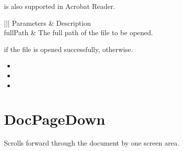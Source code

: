 \documentclass[letterpaper,12pt,english,openany,oneside]{sphinxmanual}
\begin{document}
 is also supported in Acrobat Reader.


\begin{sphinxVerbatim}[commandchars=\\\{\}]
\PYG{p}{[} \PYG{p}{]}
\end{sphinxVerbatim}
\label{\detokenize{IAC_API_DDE_Messages:parameters-6}}


\begin{savenotes}\sphinxattablestart
\centering
{}\label{\detokenize{IAC_API_DDE_Messages:section-6}}\nobreak
\begin{tabular}[t]{|||}
\hline
\sphinxstyletheadfamily 
Parameters
&\sphinxstyletheadfamily 
Description
\\
\hline
fullPath
&
The full path of the file to be opened.
\\
\hline
\end{tabular}
\par
\sphinxattableend\end{savenotes}


 if the file is opened successfully,  otherwise.

\label{\detokenize{IAC_API_DDE_Messages:related-methods-7}}
\begin{itemize}
\item {} 

\item {} 

\item {} 

\end{itemize}




\section{DocPageDown}
\label{\detokenize{IAC_API_DDE_Messages:id25}}
Scrolls forward through the document by one screen area.
\end{document}
